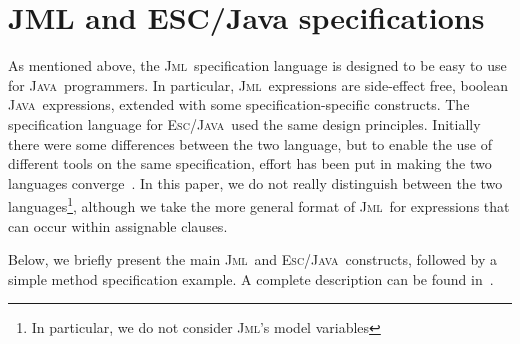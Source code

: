 \documentclass[a4paper]{llncs}
\newcommand{\jml}{\textsc{Jml}}
\newcommand{\escj}{\textsc{Esc/Java}}
\newcommand{\java}{\textsc{Java}}
\newcommand{\csrc}{\textsc{Compaq Src}}
\begin{document}
\section{JML and ESC/Java specifications}
\label{sec-esc-prg}


As mentioned above, the \jml\ specification language is designed to be 
easy to use for \java\ programmers. In particular, \jml\ expressions
are side-effect free, boolean \java\ expressions, extended with some
specification-specific constructs. The specification language for
\escj\ used the same design principles. Initially there were some
differences between the two language, but to enable the use of
different tools on the same specification, effort has been put in
making the two languages converge~\cite{EscJmlDiff}. In this paper, we 
do not really distinguish between the two languages\footnote{In
particular, we do not consider \jml's model variables}, although we
take the more general format of \jml\ for expressions that can occur
within assignable clauses.

Below, we briefly present the main \jml\ and \escj\ constructs,
followed by a simple method specification example. A complete
description can be found in~\cite{LeavensBR00,LeinoNS00}.
\end{document}
